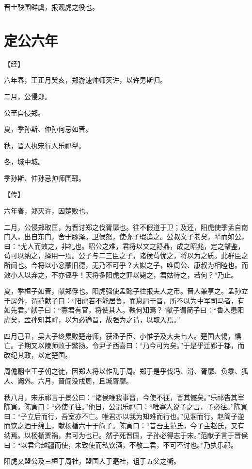\documentclass[a4paper,12pt,UTF8,twoside]{ctexbook}
\begin{document}
晋士鞅围鲜虞，报观虎之役也。

\section{定公六年}


【经】

六年春，王正月癸亥，郑游速帅师灭许，以许男斯归。

二月，公侵郑。

公至自侵郑。

夏，季孙斯、仲孙何忌如晋。

秋，晋人执宋行人乐祁犁。

冬，城中城。

季孙斯、仲孙忌帅师围郓。

【传】

六年春，郑灭许，因楚败也。

二月，公侵郑取匡，为晋讨郑之伐胥靡也。往不假道于卫；及还，阳虎使季孟自南门入，出自东门，舍于豚泽。卫侯怒，使弥子瑕追之。公叔文子老矣，辇而如公，曰：“尤人而效之，非礼也。昭公之难，君将以文之舒鼎，成之昭兆，定之鞶鉴，苟可以纳之，择用一焉。公子与二三臣之子，诸侯苟忧之，将以为之质。此群臣之所闻也。今将以小忿蒙旧德，无乃不可乎？大姒之子，唯周公、康叔为相睦也。而效小人以弃之，不亦诬乎！天将多阳虎之罪以毙之，君姑待之，若何？”乃止。

夏，季桓子如晋，献郑俘也。阳虎强使孟懿子往报夫人之币。晋人兼享之。孟孙立于房外，谓范献子曰：“阳虎若不能居鲁，而息肩于晋，所不以为中军司马者，有如先君。”献子曰：“寡君有官，将使其人。鞅何知焉？”献子谓简子曰：“鲁人患阳虎矣，孟孙知其衅，以为必適晋，故强为之请，以取入焉。”

四月己丑，吴大子终累败楚舟师，获潘子臣、小惟子及大夫七人。楚国大惕，惧亡。子期又以陵师败于繁扬。令尹子西喜曰：“乃今可为矣。”于是乎迁郢于鄀，而改纪其政，以定楚国。

周儋翩率王子朝之徒，因郑人将以作乱于周。郑于是乎伐冯、滑、胥靡、负黍、狐人、阙外。六月，晋阎没戍周，且城胥靡。

秋八月，宋乐祁言于景公曰：“诸侯唯我事晋，今使不往，晋其憾矣。”乐祁告其宰陈寅。陈寅曰：“必使子往。”他日，公谓乐祁曰：“唯寡人说子之言，子必往。”陈寅曰：“子立后而行，吾室亦不亡。唯君亦以我为知难而行也。”见溷而行。赵简子逆而饮之酒于绵上，献杨楯六十于简子。陈寅曰：“昔吾主范氏，今子主赵氏，又有纳焉。以杨楯贾祸，弗可为也已。然子死晋国，子孙必得志于宋。”范献子言于晋侯曰：“以君命越疆而使，未致使而私饮酒，不敬二君，不可不讨也。”乃执乐祁。

阳虎又盟公及三桓于周社，盟国人于亳社，诅于五父之衢。
\end{document}
